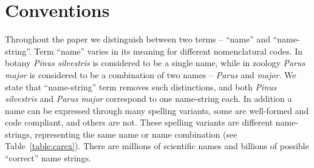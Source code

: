 \documentclass{bmcart}
\begin{document}
\begin{frontmatter}
\begin{abstractbox}

\begin{keyword}
\end{keyword}


\end{abstractbox}
%

\end{frontmatter}



\section*{Conventions}

Throughout the paper we distinguish between two terms -- ``name'' and
``name-string''.  Term ``name'' varies in its meaning for different
nomenclatural codes. In botany \textit{Pinus silvestris} is considered to be a
single name\cite{ICN}, while in zoology \textit{Parus major} is considered to
be a combination of two names -- \textit{Parus} and \textit{major}\cite{ICZN}.
We state that ``name-string'' term removes such distinctions, and both
\textit{Pinus silvestris} and \textit{Parus major} correspond to one
name-string each. In addition a name can be expressed through many spelling
variants, some are well-formed and code compliant, and others are not. These
spelling variants are different name-strings, representing the same name or
name combination (see Table~\ref{table:carex}). There are millions of
scientific names and billions of possible ``correct'' name strings.
\end{document}
